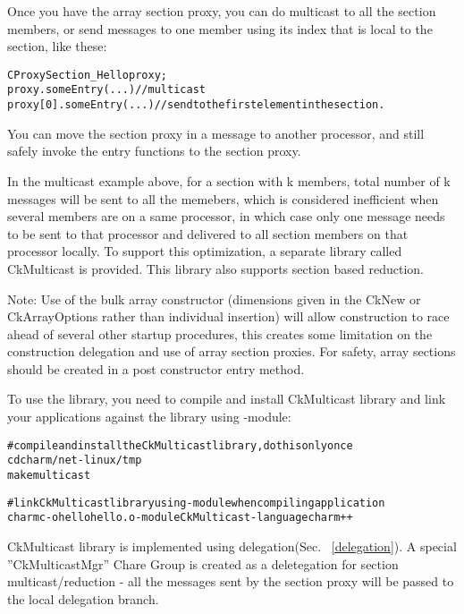 Once you have the array section proxy, you can do multicast to all the 
section members, or send messages to one member using its index that
is local to the section, like these:

\begin{alltt}
  CProxySection_Hello proxy;
  proxy.someEntry(...)          // multicast
  proxy[0].someEntry(...)       // send to the first element in the section.
\end{alltt}

You can move the section proxy in a message to another processor, and still 
safely invoke the entry functions to the section proxy.

In the multicast example above, for a section with k members, total number 
of k messages will be sent to all the memebers, which is considered 
inefficient when several members are on a same processor, in which 
case only one message needs to be sent to that processor and delivered to
all section members on that processor locally. To support this optimization,
a separate library called CkMulticast is provided. This library also supports
section based reduction.

Note: Use of the bulk array constructor (dimensions given in the CkNew
or CkArrayOptions rather than individual insertion) will allow
construction to race ahead of several other startup procedures, this
creates some limitation on the construction delegation and use of
array section proxies.  For safety, array sections should be
created in a post constructor entry method.


\label {array_section_multicast}


To use the library, you need to compile and install CkMulticast library and 
link your applications against the library using -module:

\begin{alltt}
  # compile and install the CkMulticast library, do this only once
  cd charm/net-linux/tmp
  make multicast

  # link CkMulticast library using -module when compiling application
  charmc  -o hello hello.o -module CkMulticast -language charm++ 
\end{alltt}

CkMulticast library is implemented using delegation(Sec. ~\ref{delegation}). 
A special ''CkMulticastMgr'' Chare Group is created as a 
deletegation for section multicast/reduction - all the messages sent
by the section proxy will be passed to the local delegation branch.

